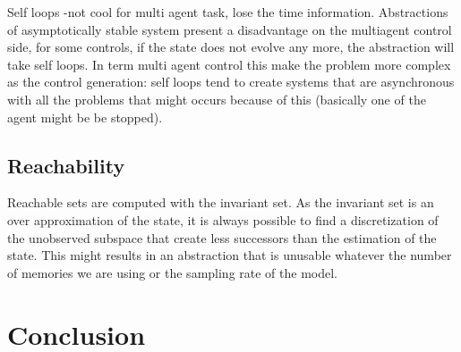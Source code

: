 Self loops -not cool for multi agent task, lose the time information.
Abstractions of asymptotically stable system present a disadvantage on the multiagent control side, for some controls, if the state does not evolve any more, the abstraction will take self loops.
In term multi agent control this make the problem more complex as the control generation: self loops tend to create systems that are asynchronous with all the problems that might occurs because of this (basically one of the agent might be be stopped).





\subsection{Reachability}
Reachable sets are computed with the invariant set. As the invariant set is an over approximation of the state,
 it is always possible to find a discretization of the unobserved subspace that create less successors than the estimation of the state.
This might results in an abstraction that is unusable whatever the number of memories we are using or the sampling rate of the model.

%
%

\section{Conclusion}
